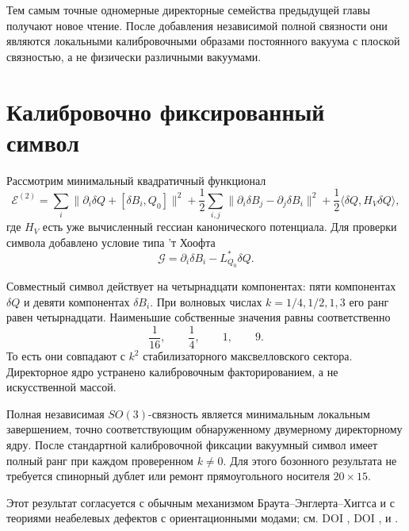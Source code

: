 Тем самым точные одномерные директорные семейства предыдущей главы
получают новое чтение. После добавления независимой полной связности они
являются локальными калибровочными образами постоянного вакуума с плоской
связностью, а не физически различными вакуумами.

\section{Калибровочно фиксированный символ}

Рассмотрим минимальный квадратичный функционал
\begin{equation}
 \mathcal E^{(2)}=
 \sum_i\|\partial_i\delta Q+[\delta B_i,Q_0]\|^2
 +\frac12\sum_{i,j}\|\partial_i\delta B_j-\partial_j\delta B_i\|^2
 +\frac12\langle\delta Q,H_V\delta Q\rangle,
 \label{eq:v6-full-gauge-quadratic-energy}
\end{equation}
где $H_V$ есть уже вычисленный гессиан канонического потенциала. Для
проверки символа добавлено условие типа 'т Хоофта
\begin{equation}
 \mathcal G=\partial_i\delta B_i-L_{Q_0}^{*}\delta Q.
 \label{eq:v6-full-gauge-fixing}
\end{equation}

Совместный символ действует на четырнадцати компонентах: пяти компонентах
$\delta Q$ и девяти компонентах $\delta B_i$. При волновых числах
$k=1/4,1/2,1,3$ его ранг равен четырнадцати. Наименьшие собственные
значения равны соответственно
\begin{equation}
 \frac1{16},\qquad\frac14,\qquad1,\qquad9.
\end{equation}
То есть они совпадают с $k^2$ стабилизаторного максвелловского сектора.
Директорное ядро устранено калибровочным факторированием, а не
искусственной массой.

\begin{theorem}
Полная независимая $SO(3)$-связность является минимальным локальным
завершением, точно соответствующим обнаруженному двумерному директорному
ядру. После стандартной калибровочной фиксации вакуумный символ имеет
полный ранг при каждом проверенном $k\ne0$. Для этого бозонного результата
не требуется спинорный дублет или ремонт прямоугольного носителя
$20\times15$.
\end{theorem}

Этот результат согласуется с обычным механизмом Браута--Энглерта--Хиггса
и с теориями неабелевых дефектов с ориентационными модами; см. DOI
, DOI
,
 и .

